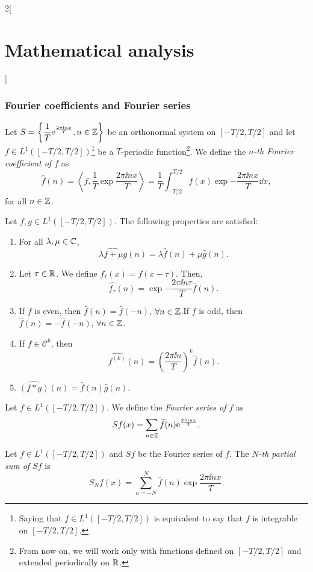 \documentclass[../../../main.tex]{subfiles}
\begin{document}
\begin{multicols}{2}[\section{Mathematical analysis}]
  \subsubsection{Fourier coefficients and Fourier series}
  \begin{definition}
    Let $\displaystyle S=\left\{\frac{1}{T}\mathrm{e}^{\frac{2\pi\mathrm{i} nx}{T}},n\in\mathbb{Z} \right\}$ be an orthonormal system on $[-T/2,T/2]$ and let $f\in L^1([-T/2,T/2])$\footnote{Saying that $f\in L^1([-T/2,T/2])$ is equivalent to say that $f$ is integrable on $[-T/2,T/2]$.} be a $T$-periodic function\footnote{From now on, we will work only with functions defined on $[-T/2,T/2]$ and extended periodically on $\mathbb{R} $.}. We define the \textit{$n$-th Fourier coefficient of $f$} as $$\widehat{f}(n)=\left\langle f,\frac{1}{T}\exp{\frac{2\pi\ii nx}{T}}\right\rangle=\frac{1}{T}\int_{-T/2}^{T/2}f(x)\exp{-\frac{2\pi\ii nx}{T}}\dd x,$$ for all $n\in\mathbb{Z} $.
  \end{definition}
  \begin{prop}
    Let $f,g\in L^1([-T/2,T/2])$. The following properties are satisfied:
    \begin{enumerate}
      \item For all $\lambda,\mu\in\mathbb{C} $, $$\widehat{\lambda f+\mu g}(n)=\lambda\widehat{f}(n)+\mu\widehat{g}(n).$$
      \item Let $\tau\in\mathbb{R} $. We define $f_\tau(x)=f(x-\tau)$. Then, $$\widehat{f_\tau}(n)=\exp{-\frac{2\pi\ii n\tau}{T}}\widehat{f}(n).$$
      \item If $f$ is even, then $\widehat{f}(n)=\widehat{f}(-n)$, $\forall n\in\mathbb{Z} $.\newline If $f$ is odd, then $\widehat{f}(n)=-\widehat{f}(-n)$, $\forall n\in\mathbb{Z} $.
      \item If $f\in \mathcal{C}^k$, then $$\widehat{f^{(k)}}(n)=\left(\frac{2\pi\ii n}{T}\right)^k\widehat{f}(n).$$
      \item $\widehat{(f*g)}(n)=\widehat{f}(n)\widehat{g}(n)$.
    \end{enumerate}
  \end{prop}
  \begin{definition}
    Let $f\in L^1([-T/2,T/2])$. We define the \textit{Fourier series of $f$} as $$\displaystyle Sf(x)=\sum_{n\in\mathbb{Z} }\widehat{f}(n)\mathrm{e}^{\frac{2\pi\mathrm{i} nx}{T}}.$$
  \end{definition}
  \begin{definition}
    Let $f\in L^1([-T/2,T/2])$ and $Sf$ be the Fourier series of $f$. The \textit{$N$-th partial sum of $Sf$} is $$S_Nf(x)=\sum_{n=-N}^N\widehat{f}(n)\exp{\frac{2\pi\ii nx}{T}}.$$

\end{definition}
\end{multicols}
\end{document}
